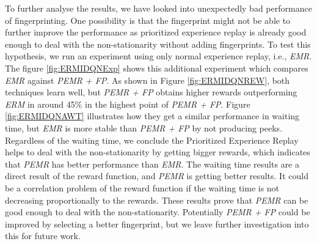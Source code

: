 \documentclass{llncs}
\begin{document}
To further analyse the results, we have looked into unexpectedly bad performance of fingerprinting. One possibility is that the fingerprint might not be able to further improve the performance as prioritized experience replay is already good enough to deal with the non-stationarity without adding fingerprints. To test this hypothesis, we run an experiment using only normal experience replay, i.e., \textit{EMR}. The figure \ref{fig:ERMIDQNExp} shows this additional experiment which compares \textit{EMR} against \textit{PEMR + FP}. As shown in Figure \ref{fig:ERMIDQNREW}, both techniques learn well, but \textit{PEMR + FP} obtains higher rewards outperforming \textit{ERM} in around 45$\%$ in the highest point of \textit{PEMR + FP}. Figure \ref{fig:ERMIDQNAWT} illustrates how they get a similar performance in waiting time, but \textit{EMR} is  more stable than \textit{PEMR + FP} by not producing peeks. Regardless of the waiting time, we conclude the Prioritized Experience Replay helps to deal with the non-stationarity by getting bigger rewards, which indicates that \textit{PEMR} has better performance than \textit{EMR}. The waiting time results are a direct result of the reward function, and \textit{PEMR} is getting better results. It could be a correlation problem of the reward function if the waiting time is not decreasing proportionally to the rewards. These results prove that \textit{PEMR} can be good enough to deal with the non-stationarity. Potentially \textit{PEMR + FP} could be improved by selecting a better fingerprint, but we leave further investigation into this for future work.
\end{document}
